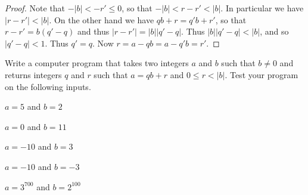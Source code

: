 \begin{proof}
Note that \(-|b| < -r' \leq 0\), so that \(-|b| < r-r' < |b|\).
In particular we have \(|r-r'| < |b|\).
On the other hand we have \(qb+r = q'b+r'\), so that \(r-r' = b(q'-q)\) and thus \(|r-r'| = |b||q'-q|\).
Thus \(|b||q'-q| < |b|\), and so \(|q'-q| < 1\).
Thus \(q' = q\).
Now \(r = a - qb = a - q'b = r'\).
\end{proof}



\Exercises%

\begin{exercise}
Write a computer program that takes two integers \(a\) and \(b\) such that \(b \neq 0\) and returns integers \(q\) and \(r\) such that \(a = qb + r\) and \(0 \leq r < |b|\).
Test your program on the following inputs.
\begin{proplist*}
\item \(a = 5 \) and \(b = 2 \)
\item \(a = 0 \) and \(b = 11 \)
\item \(a = -10 \) and \(b = 3 \)
\item \(a = -10 \) and \(b = -3 \)
\item \(a = 3^{700} \) and \(b = 2^{100} \)
\end{proplist*}
\end{exercise}
